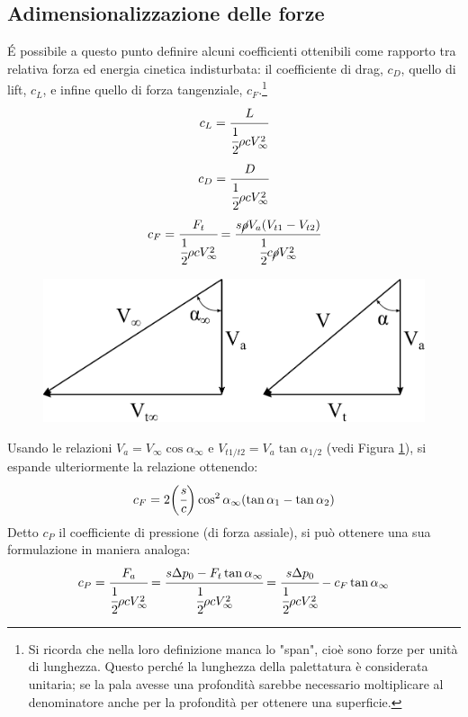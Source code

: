 \subsection{Adimensionalizzazione delle forze}
\'E possibile a questo punto definire alcuni coefficienti ottenibili come rapporto tra relativa forza ed energia cinetica indisturbata: il coefficiente di drag, $c_D$, quello di lift, $c_L$, e infine quello di forza tangenziale, $c_F$.\footnote{Si ricorda che nella loro definizione manca lo "span", cioè sono forze per unità di lunghezza. Questo perché la lunghezza della palettatura è considerata unitaria; se la pala avesse una profondità sarebbe necessario moltiplicare al denominatore anche per la profondità per ottenere una superficie.}
\begin{align*}
c_L = \cfrac{L}{\cfrac{1}{2} \rho c V_{\infty}^2}
\end{align*}
\begin{align*}
c_D = \cfrac{D}{\cfrac{1}{2} \rho c V_{\infty}^2}
\end{align*}
\begin{align*}
c_F = \cfrac{F_t}{\cfrac{1}{2} \rho c V_{\infty}^2} = \cfrac{s \cancel{\rho} V_a (V_{t1}-V_{t2})}{\cfrac{1}{2} c \cancel{\rho} V_{\infty}^2}
\end{align*}
\begin{figure}
\centering
  \includegraphics[width=.6\textwidth]{fig/trigrel.pdf}
\caption{}
\label{fig:trigrel}
\end{figure}
Usando le relazioni $V_a = V_{\infty} \cos \alpha_{\infty}$ e $V_{t1/t2} = V_a \tan \alpha_{1/2}$ (vedi Figura \ref{fig:trigrel}), si espande ulteriormente la relazione ottenendo:
\begin{equation}
c_F = 2 \bigg(\cfrac{s}{c} \bigg) \cos ^ 2 \alpha_{\infty}(\tan \alpha_1 - \tan \alpha_2)
\end{equation}
Detto $c_P$ il coefficiente di pressione (di forza assiale), si può ottenere una sua formulazione in maniera analoga:
\begin{align*}
c_P = \cfrac{F_a}{\cfrac{1}{2} \rho c V_{\infty}^2} = \cfrac{s \Delta p_0 - F_t \tan \alpha_{\infty}}{\cfrac{1}{2} \rho c V_{\infty}^2} = \cfrac{s \Delta p_0}{\cfrac{1}{2} \rho c V_{\infty}^2} - c_F \tan \alpha_{\infty}
\end{align*}
